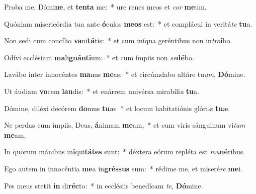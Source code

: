 \item Proba me, Dómi\textbf{ne}, et \textbf{ten}\textbf{ta} me:~* ure renes meos et \textit{cor} \textbf{me}um.
\item Quóniam misericórdia tua ante \textbf{ó}culos \textbf{me}\textbf{os} est:~* et complácui in veritá\textit{te} \textbf{tu}a.
\item Non sedi cum concílio \textbf{va}ni\textbf{tá}tis:~* et cum iníqua geréntibus non in\textit{tro}\textbf{í}bo.
\item Odívi ecclésiam \textbf{ma}li\textbf{gnán}\textbf{ti}um:~* et cum ímpiis non \textit{se}\textbf{dé}bo.
\item Lavábo inter innocéntes \textbf{ma}nus \textbf{me}as:~* et circúmdabo altáre tu\textit{um}, \textbf{Dó}mine.
\item Ut áudiam \textbf{vo}cem \textbf{lau}dis:~* et enárrem univérsa mirabíli\textit{a} \textbf{tu}a.
\item Dómine, diléxi decórem \textbf{do}mus \textbf{tu}æ:~* et locum habitatiónis glóri\textit{æ} \textbf{tu}æ.
\item Ne perdas cum ímpiis, Deus, \textbf{á}nimam \textbf{me}am,~* et cum viris sánguinum vi\textit{tam} \textbf{me}am.
\item In quorum mánibus in\textbf{i}qui\textbf{tá}\textbf{tes} sunt:~* déxtera eórum repléta est \textit{mu}\textbf{né}ribus.
\item Ego autem in innocéntia \textbf{me}a in\textbf{grés}\textbf{sus} sum:~* rédime me, et miseré\textit{re} \textbf{me}i.
\item Pes meus stetit \textbf{in} di\textbf{réc}to:~* in ecclésiis benedícam \textit{te}, \textbf{Dó}mine.
